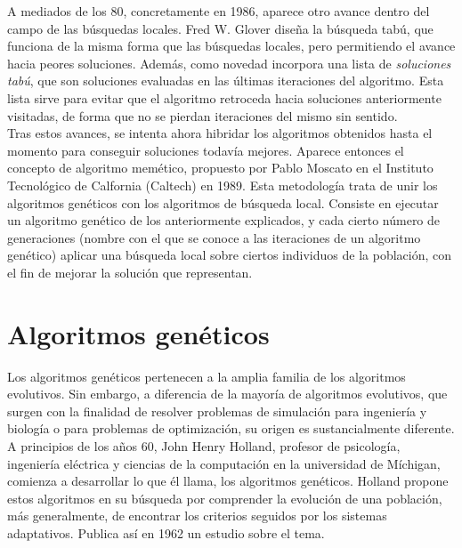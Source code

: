 \documentclass[12pt]{article} \usepackage[utf8x]{inputenc}
\begin{document}
A mediados de los 80, concretamente en 1986, aparece otro avance
dentro del campo de las búsquedas locales. Fred W. Glover diseña la
búsqueda tabú, que funciona de la misma forma que las búsquedas
locales, pero permitiendo el avance hacia peores soluciones. Además,
como novedad incorpora una lista de \textit{soluciones tabú}, que son
soluciones evaluadas en las últimas iteraciones del algoritmo. Esta
lista sirve para evitar que el algoritmo retroceda hacia soluciones
anteriormente visitadas, de forma que no se pierdan iteraciones 
del mismo sin sentido.\\

Tras estos avances, se intenta ahora hibridar los algoritmos obtenidos
hasta el momento para conseguir soluciones todavía mejores. Aparece
entonces el concepto de algoritmo memético, propuesto por Pablo Moscato
en el Instituto Tecnológico de Calfornia (Caltech) en 1989. Esta 
metodología trata de unir los algoritmos genéticos con los algoritmos
de búsqueda local. Consiste en ejecutar un algoritmo genético de los
anteriormente explicados, y cada cierto número de generaciones (nombre
con el que se conoce a las iteraciones de un algoritmo genético) aplicar
una búsqueda local sobre ciertos individuos de la población, con el fin
de mejorar la solución que representan.

\section{Algoritmos genéticos}

Los algoritmos genéticos pertenecen a la amplia familia de los algoritmos evolutivos. 
Sin embargo, a diferencia de la mayoría de algoritmos evolutivos, que surgen 
con la finalidad de resolver problemas de simulación para ingeniería y biología o para
problemas de optimización, su origen es sustancialmente diferente. A principios de 
los años 60, John Henry Holland, profesor de psicología, ingeniería eléctrica y ciencias
de la computación en la universidad de Míchigan, comienza a desarrollar lo que él llama,
los algoritmos genéticos. Holland propone estos algoritmos en su búsqueda por comprender
la evolución de una población, más generalmente, de encontrar los criterios seguidos
por los sistemas adaptativos. Publica así en 1962 un estudio sobre el tema.\\ 
\end{document}
